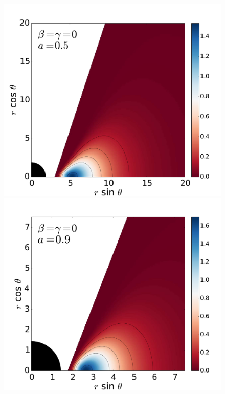 \documentclass[referee]{aa}
\begin{document}
\begin{figure}
\centering
\includegraphics[scale=0.14]{figures/fig2_1_1.pdf}
\hspace{-0.3cm}
\includegraphics[scale=0.14]{figures/fig2_1_2.pdf}
\hspace{-0.2cm}

\end{figure}
\end{document}
